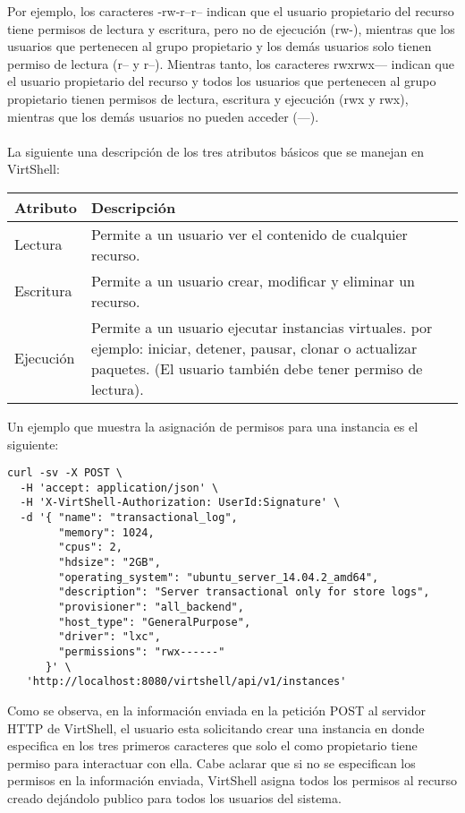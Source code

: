 Por ejemplo, los caracteres -rw-r--r-- indican que el usuario propietario del recurso tiene permisos de lectura y escritura, pero no de ejecución (rw-), mientras que los usuarios que pertenecen al grupo propietario y los demás usuarios solo tienen permiso de lectura (r-- y r--). Mientras tanto, los caracteres rwxrwx--- indican que el usuario propietario del recurso y todos los usuarios que pertenecen al grupo propietario tienen permisos de lectura, escritura y ejecución (rwx y rwx), mientras que los demás usuarios no pueden acceder (---). \\
\\
La siguiente una descripción de los tres atributos básicos que se manejan en VirtShell:

\begin{center}
 \begin{tabular}{| l | p{12cm} |}
 \hline
  \rowcolor{blueapi}
  \textbf{Atributo} & \textbf{Descripción}  \\ [0.2ex] 
  \hline\hline
  Lectura &  Permite a un usuario ver el contenido de cualquier recurso. \\
  \hline
  Escritura & Permite a un usuario crear, modificar y eliminar un recurso. \\  
  \hline
  Ejecución & Permite a un usuario ejecutar instancias virtuales. 
  por ejemplo: iniciar, detener, pausar, clonar o actualizar paquetes. 
   (El usuario también debe tener permiso de lectura). \\
  \hline
\end{tabular}
\end{center}

Un ejemplo que muestra la asignación de permisos para una instancia es el siguiente:

\medskip
\begin{lstlisting}[style=json]
curl -sv -X POST \
  -H 'accept: application/json' \
  -H 'X-VirtShell-Authorization: UserId:Signature' \
  -d '{ "name": "transactional_log",
        "memory": 1024,
        "cpus": 2,
        "hdsize": "2GB",
        "operating_system": "ubuntu_server_14.04.2_amd64",
        "description": "Server transactional only for store logs", 
        "provisioner": "all_backend",
        "host_type": "GeneralPurpose",
        "driver": "lxc",
        "permissions": "rwx------"
      }' \
   'http://localhost:8080/virtshell/api/v1/instances'
\end{lstlisting}

Como se observa, en la información enviada en la petición POST al servidor HTTP de VirtShell, el usuario esta solicitando crear una instancia en donde especifica en los tres primeros caracteres que solo el como propietario tiene permiso para interactuar con ella. Cabe aclarar que si no se especifican los permisos en la información enviada, VirtShell asigna todos los permisos al recurso creado dejándolo publico para todos los usuarios del sistema.
